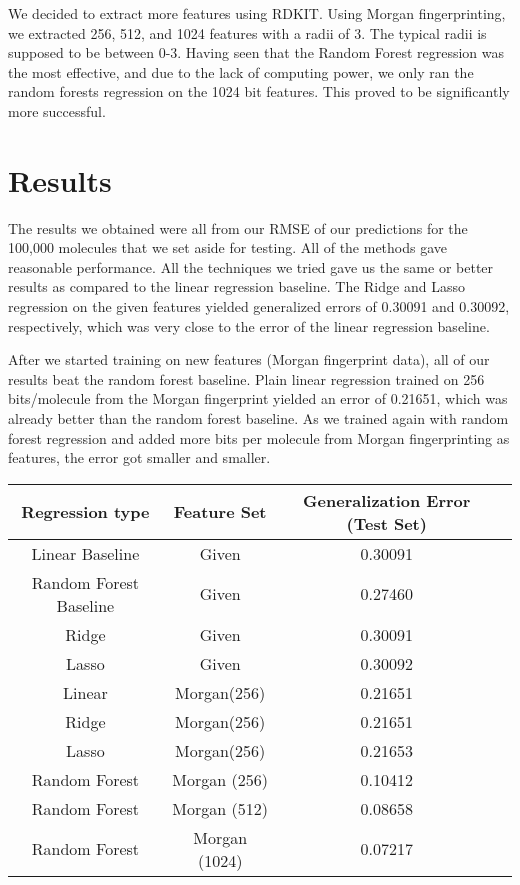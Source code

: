 \documentclass[11pt]{article}
\begin{document}
We decided to extract more features using RDKIT. Using Morgan fingerprinting, we extracted 256, 512, and 1024 features with a radii of 3. The typical radii is supposed to be between 0-3. Having seen that the Random Forest regression was the most effective, and due to the lack of computing power, we only ran the random forests regression on the 1024 bit features. This proved to be significantly more successful.



\section{Results}

The results we obtained were all from our RMSE of our predictions for the 100,000 molecules that we set aside for testing. All of the methods gave reasonable performance. All the techniques we tried gave us the same or better results as compared to the linear regression baseline. The Ridge and Lasso regression on the given features yielded generalized errors of 0.30091 and 0.30092, respectively, which was very close to the error of the linear regression baseline. 

After we started training on new features (Morgan fingerprint data), all of our results beat the random forest baseline. Plain linear regression trained on 256 bits/molecule from the Morgan fingerprint yielded an error of 0.21651, which was already better than the random forest baseline. As we trained again with random forest regression and added more bits per molecule from Morgan fingerprinting as features, the error got smaller and smaller.

\begin{center}
\begin{tabular}{|c|c|c|c|}
\hline
Regression type & Feature Set & Generalization Error (Test Set)\\
\hline
Linear Baseline &Given & 0.30091\\
Random Forest Baseline & Given& 0.27460\\
Ridge & Given& 0.30091\\
Lasso &Given& 0.30092\\
Linear&Morgan(256)& 0.21651\\
Ridge&Morgan(256)& 0.21651\\
Lasso&Morgan(256)& 0.21653 \\
Random Forest&Morgan (256)& 0.10412\\
Random Forest&Morgan (512)& 0.08658\\
Random Forest&Morgan (1024)& 0.07217\\
\hline
\end{tabular}
\end{center}
\end{document}
